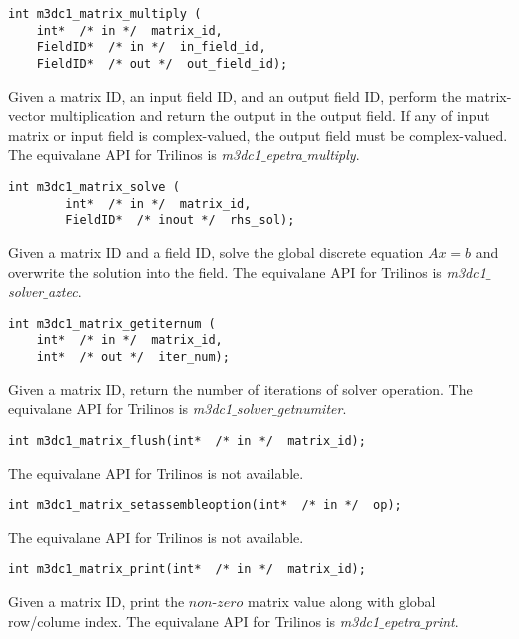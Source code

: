 \begin{verbatim}
int m3dc1_matrix_multiply (
    int*  /* in */  matrix_id, 
    FieldID*  /* in */  in_field_id, 
    FieldID*  /* out */  out_field_id); 
\end{verbatim}\vspace{-.5cm}\hspace{1cm}
Given a matrix ID, an input field ID, and an output field ID, perform the matrix-vector multiplication and return the output in the output field.
If any of input matrix or input field is complex-valued, the output field must be complex-valued. The equivalane API for Trilinos is \textit{m3dc1$\_$epetra$\_$multiply}.

\begin{verbatim}
int m3dc1_matrix_solve (
        int*  /* in */  matrix_id, 
        FieldID*  /* inout */  rhs_sol); 
\end{verbatim}\vspace{-.5cm}\hspace{1cm}
Given a matrix ID and a field ID, solve the global discrete equation $Ax=b$ and overwrite the solution into the field. The equivalane API for Trilinos is \textit{m3dc1$\_$solver$\_$aztec}.


\begin{verbatim}
int m3dc1_matrix_getiternum (
    int*  /* in */  matrix_id,
    int*  /* out */  iter_num); 
\end{verbatim}\vspace{-.5cm}\hspace{1cm}
Given a matrix ID, return the number of iterations of solver operation. The equivalane API for Trilinos is \textit{m3dc1$\_$solver$\_$getnumiter}.

\begin{verbatim}
int m3dc1_matrix_flush(int*  /* in */  matrix_id);
\end{verbatim}\vspace{-.5cm}\hspace{1cm}
 The equivalane API for Trilinos is not available.

\begin{verbatim}
int m3dc1_matrix_setassembleoption(int*  /* in */  op);
\end{verbatim}\vspace{-.5cm}\hspace{1cm}
 The equivalane API for Trilinos is not available.

\begin{verbatim}
int m3dc1_matrix_print(int*  /* in */  matrix_id);
\end{verbatim}\vspace{-.5cm}\hspace{1cm}
Given a matrix ID, print the $non$-$zero$ matrix value along with global row/colume index. The equivalane API for Trilinos is \textit{m3dc1$\_$epetra$\_$print}.

